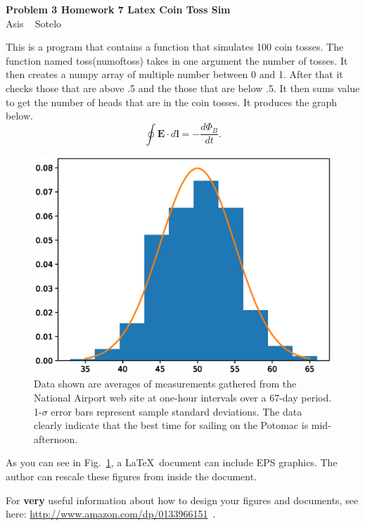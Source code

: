 \documentclass[12pt]{article}
\newcommand\thisis{Problem 3 Homework 7 Latex Coin Toss Sim}
\newcommand\theauthor{Asis ~ Sotelo}
\newcommand\sfb{\sffamily\bfseries}
\begin{document}
\thispagestyle{firstpg}

\noindent
{\sffamily\bfseries\huge \thisis}\\

\noindent
{\large\sffamily \theauthor}

\vspace*{20bp}

\noindent
This is a program that contains a function that simulates 100 coin tosses. The 
function named toss(numoftoss) takes in one argument the number of tosses.
It then creates a numpy array of multiple number between 0 and 1. After that
it checks those that are above .5 and the those that are below .5. It then 
sums value to get the number of heads that are in the coin tosses. It produces the
graph below.
\[\oint \mathbf{E}\cdot d\mathbf{l} = -\frac{d\Phi_B}{dt}.\]

\begin{figure}[h]
\begin{center}
\includegraphics[width=300bp]{wind_si}
\vspace{-18bp}
\end{center}
\caption[]{\label{fig:wind}\small
Data shown are averages of measurements gathered from
the National Airport web site at one-hour intervals over
a 67-day period.  1-$\sigma$ error bars represent sample
standard deviations.  The data clearly indicate that the
best time for sailing on the Potomac is mid-afternoon.
}
\end{figure}

As you can see in Fig.~\ref{fig:wind}, a \LaTeX\ document
can include EPS graphics.  The author can rescale these
figures from inside the document.

For {\sfb very} useful information about how to design your
figures and documents, see here:
\url{http://www.amazon.com/dp/0133966151}~.
\end{document}
